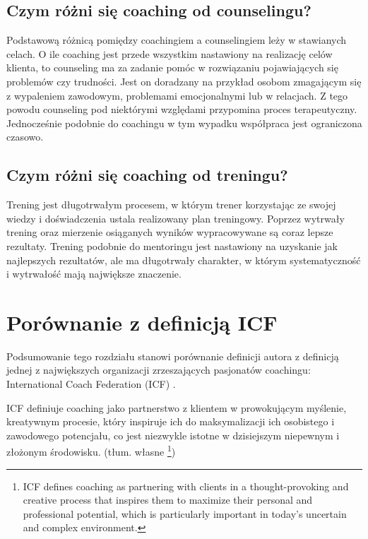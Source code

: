 \subsection{Czym różni się coaching od counselingu?}

Podstawową różnicą pomiędzy coachingiem a counselingiem leży w stawianych celach. O ile coaching jest przede wszystkim nastawiony na realizację celów
klienta, to counseling ma za zadanie pomóc w rozwiązaniu pojawiających się problemów czy trudności. Jest on doradzany na przykład osobom zmagającym się
z wypaleniem zawodowym, problemami emocjonalnymi lub w relacjach. Z tego powodu counseling pod niektórymi względami przypomina proces terapeutyczny.
Jednocześnie podobnie do coachingu w tym wypadku współpraca jest ograniczona czasowo.

\subsection{Czym różni się coaching od treningu?}

Trening jest długotrwałym procesem, w którym trener korzystając ze swojej wiedzy i doświadczenia ustala realizowany plan treningowy. Poprzez wytrwały
trening oraz mierzenie osiąganych wyników wypracowywane są coraz lepsze rezultaty. Trening podobnie do mentoringu jest nastawiony na uzyskanie
jak najlepszych rezultatów, ale ma długotrwały charakter, w którym systematyczność i wytrwałość mają największe znaczenie.

\section{Porównanie z definicją ICF}
Podsumowanie tego rozdziału stanowi porównanie definicji autora z definicją jednej z największych organizacji zrzeszających pasjonatów coachingu:
International Coach Federation (ICF) \cite{deficf}.

\begin{defn}
ICF definiuje coaching jako partnerstwo z klientem w prowokującym myślenie, kreatywnym procesie, który inspiruje ich do maksymalizacji ich
osobistego i zawodowego potencjału, co jest niezwykle istotne w dzisiejszym niepewnym i złożonym środowisku. (tłum. własne
\footnote{ICF defines coaching as partnering with clients in a thought-provoking and creative process that inspires them to maximize
their personal and professional potential, which is particularly important in today's uncertain and complex environment.})
\end{defn}

